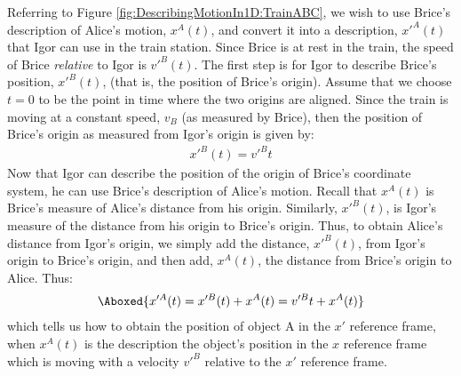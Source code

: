 Referring to Figure \ref{fig:DescribingMotionIn1D:TrainABC}, we wish to use Brice's description of Alice's motion, $x^A(t)$, and convert it into a description, $x'^A(t)$ that Igor can use in the train station. Since Brice is at rest in the train, the speed of Brice \textit{relative} to Igor is $v'^B(t)$. The first step is for Igor to describe Brice's position, $x'^B(t)$, (that is, the position of Brice's origin). Assume that we choose $t=0$ to be the point in time where the two origins are aligned. Since the train is moving at a constant speed, $v_B$ (as measured by Brice), then the position of Brice's origin as measured from Igor's origin is given by:
\begin{align*}
x'^B(t)=v'^Bt
\end{align*}
Now that Igor can describe the position of the origin of Brice's coordinate system, he can use Brice's description of Alice's motion. Recall that $x^A(t)$ is Brice's measure of Alice's distance from his origin. Similarly, $x'^B(t)$, is Igor's measure of the distance from his origin to Brice's origin. Thus, to obtain Alice's distance from Igor's origin, we simply add the distance, $x'^B(t)$, from Igor's origin to Brice's origin, and then add, $x^A(t)$, the distance from Brice's origin to Alice. Thus:
\begin{align}
\Aboxed{x'^A(t)=x'^B(t)+x^A(t)=v'^Bt+x^A(t)}
\end{align}
which tells us how to obtain the position of object A in the $x'$ reference frame, when $x^A(t)$ is the description the object's position in the $x$ reference frame which is moving with a velocity $v'^B$ relative to the $x'$ reference frame.

